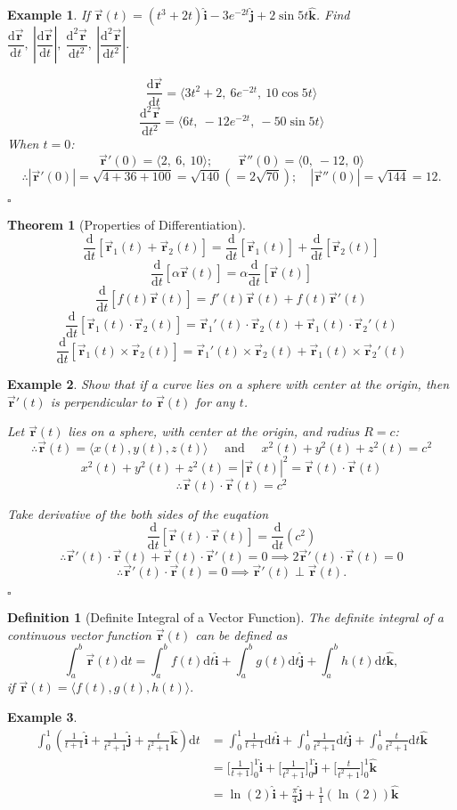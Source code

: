 \documentclass[12pt,a4paper]{article}
\newtheorem{thm}{Theorem}[subsection]
\newtheorem{df}{Definition}[subsection]
\newtheorem{eg}{Example}[subsection]
\newenvironment*{ans}{\par\indent{\textit{Answer. }}\par}{\par\hfill{$\square$}\par}
\def\d{{\mathrm{d}}}
\def\ddt{\displaystyle\frac{\d}{\d t}}
\def\vecr{\vec{\boldsymbol{\textbf{r}}}}
\def\veci{\hat{\boldsymbol{\textbf{i}}}}
\def\vecj{\hat{\boldsymbol{\textbf{j}}}}
\def\veck{\hat{\boldsymbol{\textbf{k}}}}
\begin{document}
\begin{eg}
	If $\vecr(t)=(t^3+2t)\veci-3e^{-2t}\vecj+2\sin{5t}\veck$. Find $\dfrac{\d\vecr}{\d t},\ \left|\dfrac{\d\vecr}{\d t}\right|,\ \dfrac{\d^2\vecr}{\d t^2},\ \left|\dfrac{\d^2\vecr}{\d t^2}\right|.$	
	\begin{ans}
		\[\dfrac{\d\vecr}{\d t}=\langle3t^2+2,\ 6e^{-2t},\ 10\cos{5t}\rangle\]
		\[\dfrac{\d^2\vecr}{\d t^2}=\langle6t,\ -12e^{-2t},\ -50\sin{5t}\rangle\]	
		When $t=0$: 
		\[\vecr'(0)=\langle2,\ 6,\ 10\rangle;\qquad\vecr''(0)=\langle0,\ -12,\ 0\rangle\]
		\[\therefore|\vecr'(0)|=\sqrt{4+36+100}=\sqrt{140}(=2\sqrt{70});\quad|\vecr''(0)|=\sqrt{144}=12.\]
	\end{ans}
\end{eg}
\begin{thm}[Properties of Differentiation]
	\[\ddt[\vecr_1(t)+\vecr_2(t)]=\ddt[\vecr_1(t)]+\ddt[\vecr_2(t)]\]
	\[\ddt[\alpha\vecr(t)]=\alpha\ddt[\vecr(t)]\]
	\[\ddt[f(t)\vecr(t)]=f'(t)\vecr(t)+f(t)\vecr'(t)\]
	\[\ddt[\vecr_1(t)\cdot\vecr_2(t)]=\vecr_1'(t)\cdot\vecr_2(t)+\vecr_1(t)\cdot\vecr_2'(t)\]
	\[\ddt[\vecr_1(t)\times\vecr_2(t)]=\vecr_1'(t)\times\vecr_2(t)+\vecr_1(t)\times\vecr_2'(t)\]	
\end{thm}
\begin{eg}
	Show that if a curve lies on a sphere with center at the origin, then $\vecr'(t)$ is perpendicular to $\vecr(t)$ for any $t$. 
	\begin{ans}
		Let $\vecr(t)$ lies on a sphere, with center at the origin, and radius $R=c$: \[\therefore\vecr(t)=\langle x(t), y(t), z(t)\rangle\quad\text{ and }\quad x^2(t)+y^2(t)+z^2(t)=c^2\]
		\[x^2(t)+y^2(t)+z^2(t)=|\vecr(t)|^2=\vecr(t)\cdot\vecr(t)\]
		\[\therefore\vecr(t)\cdot\vecr(t)=c^2\]\par
		Take derivative of the both sides of the euqation \[\ddt[\vecr(t)\cdot\vecr(t)]=\ddt(c^2)\]
		\[\therefore\vecr'(t)\cdot\vecr(t)+\vecr(t)\cdot\vecr'(t)=0\implies2\vecr'(t)\cdot\vecr(t)=0\]
		\[\therefore\vecr'(t)\cdot\vecr(t)=0\implies\vecr'(t)\perp\vecr(t).\]
	\end{ans}
\end{eg}
\begin{df}[Definite Integral of a Vector Function]
	The definite integral of a continuous vector function $\vecr(t)$ can be defined as \[\int_a^b\vecr(t)\d t=\int_a^bf(t)\d t\veci+\int_a^bg(t)\d t\vecj+\int_a^bh(t)\d t\veck, \] if $\vecr(t)=\Big\langle f(t), g(t), h(t)\Big\rangle.$
\end{df}
\begin{eg}
	\[\begin{aligned}
	\int_0^1\left(\frac{1}{t+1}\veci+\frac{1}{t^2+1}\vecj+\frac{t}{t^2+1}\veck\right)\d t&=\int_0^1\frac{1}{t+1}\d t\veci+\int_0^1\frac{1}{t^2+1}\d t\vecj+\int_0^1\frac{t}{t^2+1}\d t\veck\\
	&=\Bigg[\frac{1}{t+1}\Bigg]_0^1\veci+\Bigg[\frac{1}{t^2+1}\Bigg]_0^1\vecj+\Bigg[\frac{t}{t^2+1}\Bigg]_0^1\veck\\
	&=\ln(2)\veci+\frac{\pi}{4}\vecj+\frac{1}{1}(\ln(2))\veck
	\end{aligned}\]	
\end{eg}
\end{document}
